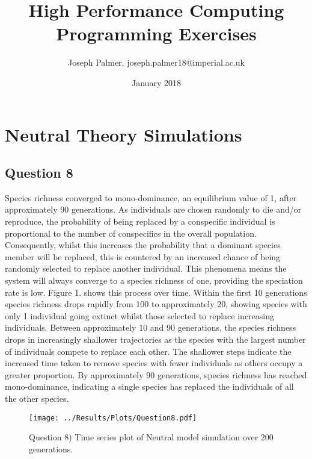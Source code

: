 \documentclass[12pt]{article}
\title{High Performance Computing Programming Exercises}
\author{Joseph Palmer, joseph.palmer18@imperial.ac.uk}
\date{January 2018}
\begin{document}
  \maketitle
  \tableofcontents
  \newpage
  \section{Neutral Theory Simulations}
    \subsection{Question 8}
    Species richness converged to mono-dominance, an equilibrium value of 1, after approximately 90 generations. As individuals are chosen randomly to die and/or reproduce, the probability of being replaced by a conspecific individual is proportional to the number of conspecifics in the overall population. Consequently, whilst this increases the probability that a dominant species member will be replaced, this is countered by an increased chance of being randomly selected to replace another individual. This phenomena means the system will always converge to a species richness of one, providing the speciation rate is low. Figure 1. shows this process over time. Within the first 10 generations species richness drops rapidly from 100 to approximately 20, showing species with only 1 individual going extinct whilst those selected to replace increasing individuals. Between approximately 10 and 90 generations, the species richness drops in increasingly shallower trajectories as the species with the largest number of individuals compete to replace each other. The shallower steps indicate the increased time taken to remove species with fewer individuals as others occupy a greater proportion. By approximately 90 generations, species richness has reached mono-dominance, indicating a single species has replaced the individuals of all the other species.
     
    \begin{figure}[H]
    	\centering
    	\texttt{[image: ../Results/Plots/Question8.pdf]}
    	\caption{Question 8) Time series plot of Neutral model simulation over 200 generations.}
    \end{figure}
\end{document}
